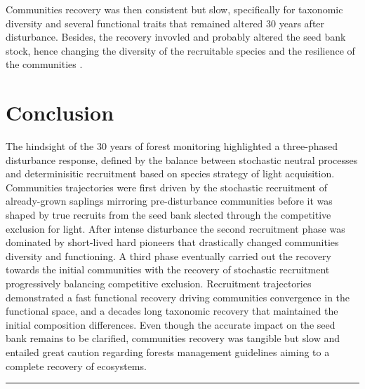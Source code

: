 \documentclass[fleqn,10pt]{ArtEcoFoG} %
\begin{document}
Communities recovery was then consistent but slow, specifically for
taxonomic diversity and several functional traits that remained altered
30 years after disturbance. Besides, the recovery invovled and probably
altered the seed bank stock, hence changing the diversity of the
recruitable species and the resilience of the communities
\citep{Norden2009}.

\section{Conclusion}\label{conclusion}

The hindsight of the 30 years of forest monitoring highlighted a
three-phased disturbance response, defined by the balance between
stochastic neutral processes and determinisitic recruitment based on
species strategy of light acquisition. Communities trajectories were
first driven by the stochastic recruitment of already-grown saplings
mirroring pre-disturbance communities before it was shaped by true
recruits from the seed bank slected through the competitive exclusion
for light. After intense disturbance the second recruitment phase was
dominated by short-lived hard pioneers that drastically changed
communities diversity and functioning. A third phase eventually carried
out the recovery towards the initial communities with the recovery of
stochastic recruitment progressively balancing competitive exclusion.
Recruitment trajectories demonstrated a fast functional recovery driving
communities convergence in the functional space, and a decades long
taxonomic recovery that maintained the initial composition differences.
Even though the accurate impact on the seed bank remains to be
clarified, communities recovery was tangible but slow and entailed great
caution regarding forests management guidelines aiming to a complete
recovery of ecosystems.

\begin{center}\rule{0.5\linewidth}{\linethickness}\end{center}



\makeatletter

\makeatother


\end{document}
